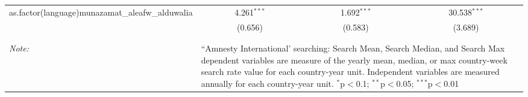 \begin{table}[!htbp]
\begin{tabular}{@{\extracolsep{5pt}}lccc}
  as.factor(language)munazamat\_aleafw\_alduwalia & 4.261$^{***}$ & 1.692$^{***}$ & 30.538$^{***}$ \\ 
  & (0.656) & (0.583) & (3.689) \\ 
 \hline \\[-1.8ex] 
\hline 
\hline \\[-1.8ex] 
\textit{Note:}  & \multicolumn{3}{l}{\parbox[t]{8cm}{``Amnesty International' searching: Search Mean, Search Median, and Search Max dependent variables are measure of the yearly mean, median, or max country-week search rate value for each country-year unit. Independent variables are measured annually for each country-year unit. $^{*}$p$<$0.1; $^{**}$p$<$0.05; $^{***}$p$<$0.01}} \\ 
\end{tabular} 
\end{table} 
